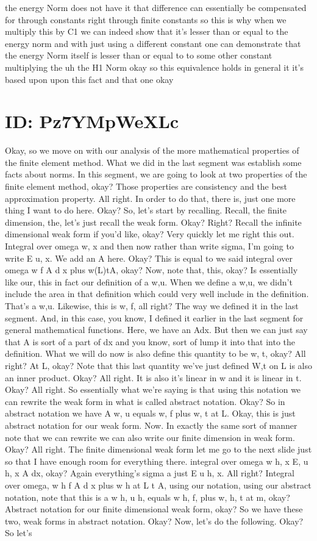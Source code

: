 \documentclass[10pt]{article}
\begin{document}
{the energy Norm does not have it that difference can essentially be compensated for through constants right through finite constants so this is why when we multiply this by C1 we can indeed show that it's lesser than or equal to the energy norm and with just using a different constant one can demonstrate that the energy Norm itself is lesser than or equal to to some other constant multiplying the uh the H1 Norm okay so this equivalence holds in general it it's based upon upon this fact and that one okay

\section*{ID: Pz7YMpWeXLc}
Okay, so we move on with our analysis of the more mathematical properties of the finite element method. What we did in the last segment was establish some facts about norms. In this segment, we are going to look at two properties of the finite element method, okay? Those properties are consistency and the best approximation property. All right. In order to do that, there is, just one more thing I want to do here. Okay? So, let's start by recalling. Recall, the finite dimension, the, let's just recall the weak form. Okay? Right? Recall the infinite dimensional weak form if you'd like, okay? Very quickly let me right this out. Integral over omega w, x and then now rather than write sigma, I'm going to write E u, x. We add an A here. Okay? This is equal to we said integral over omega w f A d x plus w(L)tA, okay? Now, note that, this, okay? Is essentially like our, this in fact our definition of a w,u. When we define a w,u, we didn't include the area in that definition which could very well include in the definition. That's a w,u. Likewise, this is w, f, all right? The way we defined it in the last segment. And, in this case, you know, I defined it earlier in the last segment for general mathematical functions. Here, we have an Adx. But then we can just say that A is sort of a part of dx and you know, sort of lump it into that into the definition. What we will do now is also define this quantity to be w, t, okay? All right? At L, okay? Note that this last quantity we've just defined W,t on L is also an inner product. Okay? All right. It is also it's linear in w and it is linear in t. Okay? All right. So essentially what we're saying is that using this notation we can rewrite the weak form in what is called abstract notation. Okay? So in abstract notation we have A w, u equals w, f plus w, t at L. Okay, this is just abstract notation for our weak form. Now. In exactly the same sort of manner note that we can rewrite we can also write our finite dimension in weak form. Okay? All right. The finite dimensional weak form let me go to the next slide just so that I have enough room for everything there. integral over omega w h, x E, u h, x A dx, okay? Again everything's sigma a just E u h, x. All right? Integral over omega, w h f A d x plus w h at L t A, using our notation, using our abstract notation, note that this is a w h, u h, equals w h, f, plus w, h, t at m, okay? Abstract notation for our finite dimensional weak form, okay? So we have these two, weak forms in abstract notation. Okay? Now, let's do the following. Okay? So let's }
\end{document}
